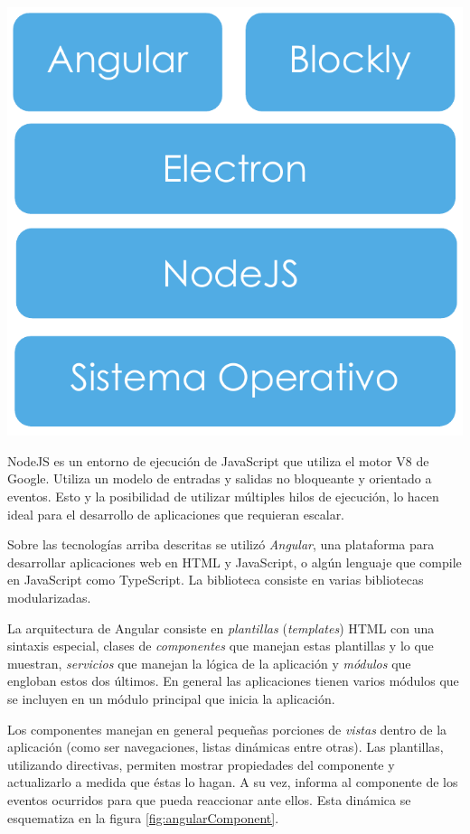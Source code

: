 \begin{center}
    \includegraphics[scale=.8]{./Figures/ide-layers.pdf}
    \label{fig:ideLayers}
\end{center}

NodeJS es un entorno de ejecución de JavaScript que utiliza el motor V8 de Google. Utiliza un modelo de entradas y salidas no bloqueante y orientado a eventos. Esto y la posibilidad de utilizar múltiples hilos de ejecución, lo hacen ideal para el desarrollo de aplicaciones que requieran escalar.

Sobre las tecnologías arriba descritas se utilizó \emph{Angular}\citep{angular}, una plataforma para desarrollar aplicaciones web en HTML y JavaScript, o algún lenguaje que compile en JavaScript como TypeScript. La biblioteca consiste en varias bibliotecas modularizadas. 

La arquitectura de Angular consiste en \emph{plantillas} (\emph{templates}) HTML con una sintaxis especial, clases de \emph{componentes} que manejan estas plantillas y lo que muestran, \emph{servicios} que manejan la lógica de la aplicación y \emph{módulos} que engloban estos dos últimos. En general las aplicaciones tienen varios módulos que se incluyen en un módulo principal que inicia la aplicación.

Los componentes manejan en general pequeñas porciones de \emph{vistas} dentro de la aplicación (como ser navegaciones, listas dinámicas entre otras). Las plantillas, utilizando directivas, permiten mostrar propiedades del componente y actualizarlo a medida que éstas lo hagan. A su vez, informa al componente de los eventos ocurridos para que pueda reaccionar ante ellos. Esta dinámica se esquematiza en la figura \ref{fig:angularComponent}.

